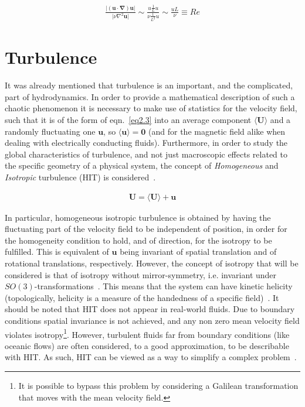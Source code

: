 \documentclass[12pt,a4paper]{report}
\begin{document}
\begin{align}
 \frac{\vert (\bm u \cdot \bm \nabla) \bm u \vert}{\vert \nu \nabla^2 \bm u \vert} \sim \frac{u \frac{1}{L} u}{\nu \frac{1}{L^2} u} \sim \frac{u L}{\nu} \equiv Re \nonumber
\end{align}

\section{Turbulence}
\label{sec2.2}

It was already mentioned that turbulence is an important, and the complicated, part of hydrodynamics. In order to provide a mathematical description of such a chaotic phenomenon it is necessary to make use of statistics for the velocity field, such that it is of the form of eqn.~\ref{eq2.3} into an average component $\langle \bm U \rangle$ and a randomly fluctuating one $\bm u$, so $\langle \bm u \rangle = \bm 0$ (and for the magnetic field alike when dealing with electrically conducting fluids). Furthermore, in order to study the global characteristics of turbulence, and not just macroscopic effects related to the specific geometry of a physical system, the concept of \textit{Homogeneous} and \textit{Isotropic} turbulence (HIT) is considered~\cite{biskamp1997nonlinear}.

\begin{align}
 \bm U = \langle \bm U \rangle + \bm u
 \label{eq2.3}
\end{align}

In particular, homogeneous isotropic turbulence is obtained by having the fluctuating part of the velocity field to be independent of position, in order for the homogeneity condition to hold, and of direction, for the isotropy to be fulfilled. This is equivalent of $\bm u$ being invariant of spatial translation and of rotational translations, respectively. However, the concept of isotropy that will be considered is that of isotropy without mirror-symmetry, i.e. invariant under $SO(3)$-transformations~\cite{biskamp1997nonlinear}. This means that the system can have kinetic helicity (topologically, helicity is a measure of the handedness of a specific field)~\cite{brandenburg2005astrophysical, hughes1996kinetic}. It should be noted that HIT does not appear in real-world fluids. Due to boundary conditions spatial invariance is not achieved, and any non zero mean velocity field violates isotropy\footnote{It is possible to bypass this problem by considering a Galilean transformation that moves with the mean velocity field.}. However, turbulent fluids far from boundary conditions (like oceanic flows) are often considered, to a good approximation, to be describable with HIT. As such, HIT can be viewed as a way to simplify a complex problem~\cite{LinkmannMoritzFrederikLeon2016Spim}. 
\end{document}
